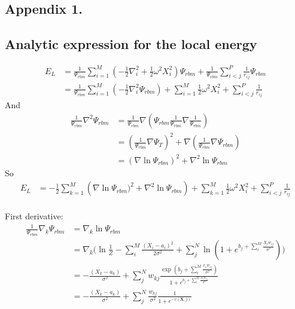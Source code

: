 \documentclass[%
oneside,                 %
final,                   %
10pt]{article}
\begin{document}
\begin{appendices}
\section{Appendix 1.} \label{APP_1}
\subsection{Analytic expression for the local energy}
\begin{equation}
\begin{aligned}
E_L &=\frac{1}{ \Psi_{rbm}  }   \sum_{i=1}^{M} \left(  -\frac{1}{2} \nabla_i^2 + \frac{1}{2} \omega^2 X_i^2  \right) \Psi_{rbm} + \frac{1}{ \Psi_{rbm} }  \sum_{i<j}^P \frac{1}{r_{ij}}  \Psi_{rbm} \\
&=\frac{1}{\Psi_{rbm}}   \sum_{i=1}^{M} \left(  -\frac{1}{2} \nabla_i^2 \Psi_{rbm} \right) + \sum_{i=1}^{M} \frac{1}{2} \omega^2 X_i^2    +  \sum_{i<j}^P\frac{1}{r_{ij}}  
\end{aligned}
\end{equation}
And
\begin{equation}
\begin{aligned}
\frac{1}{\Psi_{rbm}}\nabla^2 \Psi_{rbm} &=  \frac{1}{\Psi_{rbm}}\nabla (\Psi_{rbm} \frac{1}{\Psi_{rbm}} \nabla \frac{1}{\Psi_{rbm}})\\
&= (\frac{1}{\Psi_{rbm}} \nabla \Psi_T) ^2 + \nabla (\frac{1}{\Psi_{rbm}}\nabla \Psi_{rbm})\\ 
&= (\nabla \ln \Psi_{rbm})^2 + \nabla^2 \ln \Psi_{rbm}
\end{aligned}
\end{equation}
So
\begin{equation}
\begin{aligned}
E_L
&= -\frac{1}{2}  \sum_{k=1}^{M} \left( \nabla \ln \Psi_{rbm})^2 + \nabla^2 \ln \Psi_{rbm} \right) + \sum_{k=1}^{M} \frac{1}{2} \omega^2X_i^2    +  \sum_{i<j}^P\frac{1}{r_{ij}}  \\
\label{eq:Appendix_1EL}
\end{aligned}
\end{equation}


First derivative:
\begin{equation}
\begin{aligned}
\frac{1}{\Psi_{rbm}} \nabla_k \Psi_{rbm} &= \nabla_k  \ln \Psi_{rbm} \\
&= \nabla_k  \big( \ln \frac{1}{Z}  -\sum_i^M \frac{(X_i - a_i)^2}{2\sigma^2} +  \sum_j^N \ln (1 + e^{ b_j + \sum_i^M \frac{X_i w_{ij}}{\sigma^2}}) \big) \\
&= 
  - \frac{(X_k - a_k)}{\sigma^2} + \sum_{j}^N w_{kj}\frac{\exp (b_j + \sum_i^M \frac{x_i w_{ij}}{\sigma^2})}{1 + e^{ b_j + \sum_i^M \frac{X_i w_{ij}}{\sigma^2}}}  \\
&= - \frac{(X_k - a_k)}{\sigma^2} + \sum_{j}^N \frac{w_{kj}}{\sigma^2}\frac{1}{1 + e^{-v(\bm X,j)}}
\end{aligned}
\label{eq:Appendix_1derivative}
\end{equation}


\end{appendices}
\end{document}
